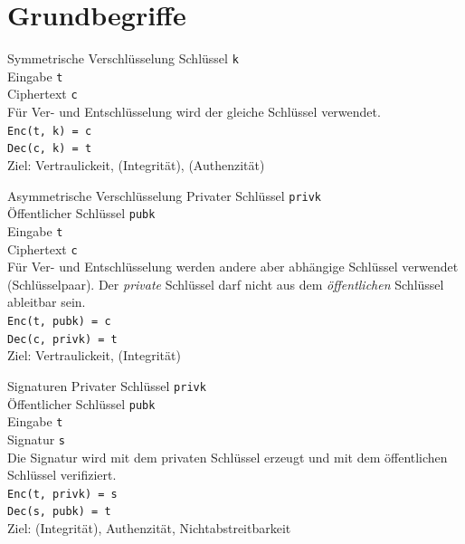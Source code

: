 \documentclass[10pt]{beamer}
\begin{document}
	\section{Grundbegriffe}
	
	\begin{frame}{Symmetrische Verschlüsselung}
		\alert{Schlüssel} \texttt{k}\\
		\alert{Eingabe} \texttt{t}\\
		\alert{Ciphertext} \texttt{c}\\
		\vspace{0.5cm}
		Für Ver- und Entschlüsselung wird der gleiche Schlüssel verwendet.\\
		\texttt{Enc(t, k) = c}\\
		\texttt{Dec(c, k) = t}\\
		Ziel: Vertraulickeit, (Integrität), (Authenzität)
	\end{frame}
	
	\begin{frame}{Asymmetrische Verschlüsselung}
		\alert{Privater Schlüssel} \texttt{privk}\\
		\alert{Öffentlicher Schlüssel} \texttt{pubk}\\
		\alert{Eingabe} \texttt{t}\\
		\alert{Ciphertext} \texttt{c}\\
		\vspace{0.5cm}
		Für Ver- und Entschlüsselung werden andere aber abhängige Schlüssel verwendet (Schlüsselpaar).
		Der \emph{private} Schlüssel darf nicht aus dem \emph{öffentlichen} Schlüssel ableitbar sein.\\
		\texttt{Enc(t, pubk) = c}\\
		\texttt{Dec(c, privk) = t}\\
		\alert{Ziel}: Vertraulickeit, (Integrität)\\
	\end{frame}

	\begin{frame}{Signaturen}
		\alert{Privater Schlüssel} \texttt{privk}\\
		\alert{Öffentlicher Schlüssel} \texttt{pubk}\\
		\alert{Eingabe} \texttt{t}\\
		\alert{Signatur} \texttt{s}\\
		\vspace{0.5cm}
		Die Signatur wird mit dem privaten Schlüssel erzeugt und mit dem öffentlichen Schlüssel verifiziert.\\
		\texttt{Enc(t, privk) = s}\\
		\texttt{Dec(s, pubk) = t}\\
		\alert{Ziel}: (Integrität), Authenzität, Nichtabstreitbarkeit\\
	\end{frame}
\end{document}
